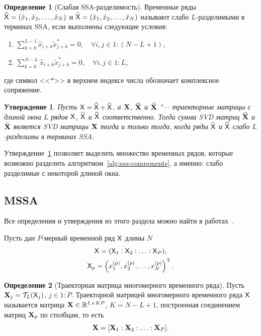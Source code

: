 \documentclass[specialist,
  substylefile=spbu_report.rtx,
subf,href,colorlinks=true, 12pt]{disser}
\theoremstyle{plain}
\newtheorem{statement}{Утверждение}[section]
\theoremstyle{definition}
\newtheorem{definition}{Определение}[section]
\theoremstyle{remark}
\begin{document}
\begin{definition}[Слабая SSA-разделимость]
  \label{def:ssa-separability}
  Временные ряды $\widehat{\mathsf{X}} = (\hat{x}_1, \hat{x}_2, \ldots, \hat{x}_N)$ и
  $\widetilde{\mathsf{X}} = (\tilde{x}_1, \tilde{x}_2, \ldots, \tilde{x}_N)$
  называют слабо $L$-разделимыми в терминах
  SSA, если выполнены следующие условия:
  \begin{enumerate}
    \item $\displaystyle \sum_{k=0}^{L - 1} \hat{x}_{i +
      k}\tilde{x}^*_{j + k} = 0,
      \quad \forall i, j \in \overline{1:(N - L + 1)}$,
    \item $\displaystyle \sum_{k=0}^{N - L} \hat{x}_{i +
      k}\tilde{x}^*_{j + k} = 0,
      \quad \forall i, j \in \overline{1:L}$,
  \end{enumerate}
  где символ <<$*$>> в верхнем индексе числа обозначает комплексное сопряжение.
\end{definition}

\begin{statement}
  \label{state:ssa-separability}
  Пусть $\mathsf{X} = \widehat{\mathsf{X}} + \widetilde{\mathsf{X}}$, а $\mathbf{X}$,
  $\widehat{\mathbf{X}}$ и $\widetilde{\mathbf{X}}$ "--- траекторные
  матрицы с длиной окна $L$ рядов $\mathsf{X}$, $\widehat{\mathsf{X}}$ и
  $\widetilde{\mathsf{X}}$ соответственно.
  Тогда сумма \emph{SVD} матриц $\widehat{\mathbf{X}}$ и $\widetilde{\mathbf{X}}$
  является \emph{SVD} матрицы $\mathbf{X}$ тогда и только тогда, когда
  ряды $\widehat{\mathsf{X}}$ и $\widetilde{\mathsf{X}}$ слабо $L$-разделимы в
  терминах \emph{SSA}.
\end{statement}

Утверждение~\ref{state:ssa-separability} позволяет выделить множество
временных рядов, которые возможно
разделить алгоритмом~\ref{alg:ssa-components}, а именно: слабо
разделимые с некоторой длиной окна.

\subsection{MSSA}\label{subsec:mssa}
Все определения и утверждения из этого раздела можно найти в
работах~\cite{mssa, mssa2, ssa-2020}.

Пусть дан $P$-мерный временной ряд $\mathsf{X}$ длины $N$
\begin{gather*}
  \mathsf{X} = (\mathsf{X}_1: \mathsf{X}_2: \ldots: \mathsf{X}_P), \\
  \mathsf{X}_p = \left(x_1^{(p)}, x_2^{(p)}, \ldots, x_N^{(p)}\right)^{\mathrm{T}}.
\end{gather*}

\begin{definition}[Траекторная матрица многомерного временного ряда]
  Пусть \linebreak $\mathbf{X}_j = \mathcal{T}_L(\mathsf{X}_j)$, $j \in \overline{1:P}$.
  Траекторной матрицей многомерного временного ряда $\mathsf{X}$ называется
  матрица $\mathbf{X}\in \mathbb{R}^{L \times KP}$, $K = N - L + 1$, построенная
  соединением матриц $\mathbf{X}_p$ по столбцам, то есть
  \[
    \mathbf{X} = [\mathbf{X}_1 : \mathbf{X}_2 : \ldots : \mathbf{X}_P].
  \]
\end{definition}
\end{document}

